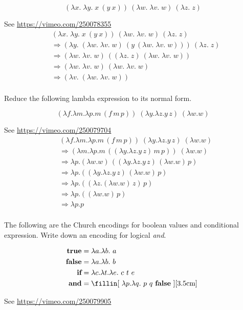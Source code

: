 \documentclass[addpoints]{exam}
\renewcommand{\L}[2]{\lambda #1.#2}
\begin{document}
\begin{questions}
  \[
  (\lambda x.\;\lambda y.\;x~(y~x))~(\lambda w.\;\lambda v.\;w)~(\lambda z.\;z)
  \]
  \begin{solutionbox}{5cm}
    See \url{https://vimeo.com/250078355}
    \begin{align*}
      & (\lambda x.\;\lambda y.\;x~(y~x))~(\lambda w.\;\lambda v.\;w)~(\lambda z.\;z)\\
      & \Rightarrow (\lambda y.\;(\lambda w.\;\lambda v.\;w)~(y~(\lambda w.\;\lambda v.\;w)))~(\lambda z.\;z)\\
      & \Rightarrow (\lambda w.\;\lambda v.\;w)~((\lambda z.\;z)~(\lambda w.\;\lambda v.\;w))\\
      & \Rightarrow (\lambda w.\;\lambda v.\;w)~(\lambda w.\;\lambda v.\;w)\\
      & \Rightarrow (\lambda v.\;(\lambda w.\;\lambda v.\;w))\\
    \end{align*}
  \end{solutionbox}

  \newpage
  \question
  Reduce the following lambda expression to its normal form.

  \[
    (\L{f}{\L{m}{\L{p}{m\,(f\,m\,p)}}})\;(\L{y}{\L{z}{y\,z}})\;(\L{w}{w})
  \]

  \begin{solutionbox}{5cm}
    See \url{https://vimeo.com/250079704}
    \begin{align*}
      & (\L{f}{\L{m}{\L{p}{m\,(f\,m\,p)}}})\;(\L{y}{\L{z}{y\,z}})\;(\L{w}{w})\\
      & \Rightarrow (\L{m}{\L{p}{m\,((\L{y}{\L{z}{y\,z}})\,m\,p)}})\;(\L{w}{w})\\
      & \Rightarrow \L{p}{(\L{w}{w})\,((\L{y}{\L{z}{y\,z}})\,(\L{w}{w})\,p)}\\
      & \Rightarrow \L{p}{((\L{y}{\L{z}{y\,z}})\,(\L{w}{w})\,p)}\\
      & \Rightarrow \L{p}{((\L{z}{(\L{w}{w})\,z})\,p)}\\
      & \Rightarrow \L{p}{((\L{w}{w})\,p)}\\
      & \Rightarrow \L{p}{p}\\
    \end{align*}
  \end{solutionbox}


  \question
  The following are the Church encodings for boolean values and conditional expression.
  Write down an encoding for logical \emph{and}.

  \begin{align*}
    \textbf{true} & = \lambda a. \lambda b.~a \\
    \textbf{false}& = \lambda a. \lambda b.~b \\
    \textbf{if}   & = \lambda c. \lambda t. \lambda e.~c~t~e\\
    \textbf{and}  & = \textrm{\fillin[ $\lambda p. \lambda q.~p~q~\textbf{false}$ ][3.5cm] }\\
  \end{align*}
  \begin{solution}
    See \url{https://vimeo.com/250079905}
  \end{solution}


\end{questions}
\end{document}
